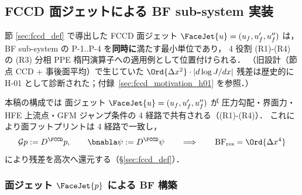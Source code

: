 %
%
\subsection{FCCD 面ジェットによる BF sub-system 実装}
\label{sec:fccd_bf_sub_system}

節 \ref{sec:fccd_def} で導出した FCCD 面ジェット
$\FaceJet{u}=(u_f,u'_f,u''_f)$ は，BF sub-system の
P-1..P-4 を\textbf{同時に}満たす最小単位であり，
4 役割 (R1)-(R4) の (R3) 分相 PPE 楕円演算子への適用例として位置付けられる．
（旧設計（節点 CCD + 事後面平均）で生じていた $\Ord{\Delta x^2}\cdot|d\log J/dx|$
残差は歴史的に H-01 として診断された；付録~\ref{sec:fccd_motivation_h01} を参照．）

\label{sec:h01_diagnosis_fccd_remedy}%

本稿の構成では {\FCCD} 面ジェット $\FaceJet{u}=(u_f,u'_f,u''_f)$ が
圧力勾配・界面力・HFE 上流点・GFM ジャンプ条件の 4 経路で共有される（(R1)-(R4)）．
これにより面フットプリントは 4 経路で一致し，
\begin{equation}
  \mathcal{G}p := D^\FCCD p,
  \qquad \bnabla\psi := D^\FCCD\psi
  \qquad\Longrightarrow\qquad
  \mathrm{BF}_\text{res} = \Ord{\Delta x^4}
  \label{eq:bf_fccd_unification}
\end{equation}
により残差を高次へ還元する（§\ref{sec:fccd_def}）．

\subsubsection{面ジェット $\FaceJet{p}$ による BF 構築}
\label{sec:face_jet_bf_construction}

